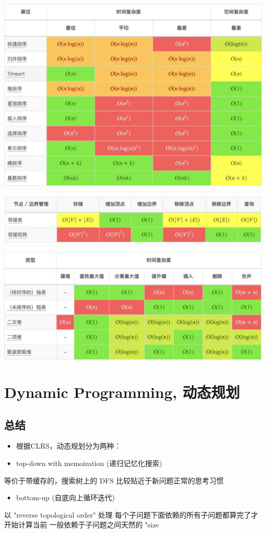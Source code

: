 \documentclass[9pt, b5paaper]{book}
\begin{document}
\includegraphics[width=.9\linewidth]{./pic/bigo3.jpeg}

\includegraphics[width=.9\linewidth]{./pic/bigo4.jpeg}

\includegraphics[width=.9\linewidth]{./pic/bigo5.jpeg}

\chapter{Dynamic Programming, 动态规划}
\label{sec-2}
\section{总结}
\label{sec-2-1}
\begin{itemize}
\item 根据CLRS，动态规划分为两种：
\item top-down with memoization (递归记忆化搜索)
\end{itemize}
等价于带缓存的，搜索树上的 DFS
比较贴近于新问题正常的思考习惯
\begin{itemize}
\item bottom-up (自底向上循环迭代)
\end{itemize}
以 "reverse topological order" 处理
每个子问题下面依赖的所有子问题都算完了才开始计算当前
一般依赖于子问题之间天然的 "size
\end{document}
